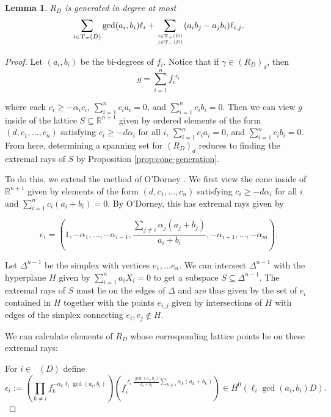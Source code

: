 \documentclass{amsart}
\theoremstyle{plain}
\newtheorem{lem}[thm]{Lemma}
\theoremstyle{definition}
\theoremstyle{remark}
\numberwithin{equation}{section}
\newcommand\bida{a}
\newcommand\bidb{b}
\DeclareMathOperator{\Te}{T_=}
\DeclareMathOperator{\Tp}{T_+}
\DeclareMathOperator{\Tm}{T_-}
\begin{document}
\begin{lem}\label{Hirzebruch-generators}
$R_D$ is generated in degree at most
\[
	\sum_{i\in \Te(D)} \gcd(\bida_i, \bidb_i) \ell_i + \sum_{i\in \Tp(D) \atop j\in \Tm(D)} (\bida_i \bidb_j- \bida_j \bidb_i)\ell_{i,j}.
\]
\end{lem}

\begin{proof}
Let $(\bida_i, \bidb_i)$ be the bi-degrees of $f_i$. Notice that if $\gamma
\in (R_D)_d$, then 
\[
	g = \sum_{i=1}^n {f_i}^{c_i}
\]

\noindent
where each $c_i \ge - \alpha_i c_i$, $\sum_{i=1}^n c_i \bida_i = 0$,
and $\sum_{i=1}^n c_i \bidb_i = 0$. Then we can view $g$ inside of the
lattice $S \subseteq \mathbb{R}^{n + 1}$ given by ordered elements of
the form $(d, c_1, \ldots, c_n)$ satisfying $c_i \ge - d \alpha_i$
for all $i$, $\sum_{i=1}^n c_i \bida_i = 0$, and $\sum_{i = 1}^n c_i \bidb_i =
 0$. From here, determining a spanning set for $(R_D)_d$ reduces to
finding the extremal rays of $S$ by Proposition \ref{prop:cone-generation}.

To do this, we extend the method of O'Dorney \cite[Theorem 8]{dorney:canonical}. 
We first
view the cone inside of $\mathbb{R}^{n+1}$ given by elements of the
form $(d, c_1, \ldots, c_n)$ satisfying $c_i \ge -d \alpha_i$ for
all $i$ and $\sum_{i = 1}^n c_i (\bida_i + \bidb_i) =0$. By O'Dorney, this
has extremal rays given by
 
\[
	e_i = (1, -\alpha_1, \ldots, -\alpha_{i-1}, \frac{\sum_{j \ne i}
	\alpha_j(\bida_j+ \bidb_j)}{\bida_i + \bidb_i}, -\alpha_{i + 1}, \ldots, - \alpha_m).
\]

Let $\Delta^{n-1}$ be the simplex with vertices $e_1, \ldots e_n$.
We can intersect $\Delta^{n-1}$ with the hyperplane $H$ given by 
$\sum_{i=1}^n \bida_i X_i = 0$
 to get a subspace $S \subseteq \Delta^{n-1}$. The extremal rays of $S$ must lie on the edges of $\Delta$  and are thus given
by the set of $e_i$ contained in $H$ together with the points $e_{i, j}$ given by intersections of $H$ with edges of the simplex
connecting $e_i, e_j \not \in H$.

We can calculate elements of $R_D$ whose
corresponding lattice points lie on these extremal rays:

For $i \in \Te(D)$
define
\[
	\epsilon_i := (\prod_{k \ne i} f_k^{-\alpha_k \ell_i \gcd(\bida_i, \bidb_i)})
	(f_i^{\ell_i \frac{\gcd(\bida_i, \bidb_i)}{\bida_i + \bidb_i}\sum_{k \ne i}
	\alpha_k (\bida_k + \bidb_k)}) \in H^0(\ell_i \gcd(\bida_i, \bidb_i) D).
\]


\end{proof}
\end{document}
